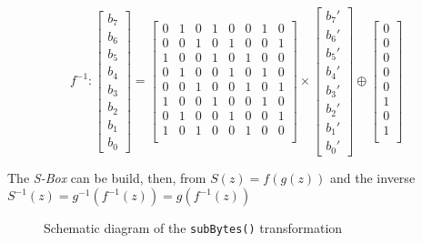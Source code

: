 \documentclass[10pt,a4paper,twoside]{llncs}
\begin{document}
\begin{equation}\label{eq:invSubBytes:matrix}
 f^{-1}:
 \left[
  \begin{array}{c}
    b_{7}\\b_{6}\\b_{5}\\b_{4}\\b_{3}\\b_{2}\\b_{1}\\b_{0}
  \end{array}
 \right]=\left[
  \begin{array}{cccccccc}
    0&1&0&1&0&0&1&0\\
    0&0&1&0&1&0&0&1\\
    1&0&0&1&0&1&0&0\\
    0&1&0&0&1&0&1&0\\
    0&0&1&0&0&1&0&1\\
    1&0&0&1&0&0&1&0\\
    0&1&0&0&1&0&0&1\\
    1&0&1&0&0&1&0&0\\
  \end{array}
 \right]\times\left[
  \begin{array}{c}
    b_{7}'\\b_{6}'\\b_{5}'\\b_{4}'\\b_{3}'\\b_{2}'\\b_{1}'\\b_{0}'
  \end{array}
 \right]\oplus\left[
  \begin{array}{c}
    0\\0\\0\\0\\0\\1\\0\\1\\
  \end{array}
 \right]
\end{equation}

The \emph{S-Box} can be build, then, from $S(z)=f(g(z))$ and the inverse $S^{-1}(z)=g^{-1}(f^{-1}(z))=g(f^{-1}(z))$

\begin{figure}[ht]
\begin{center}

\caption{Schematic diagram of the {\tt subBytes()} transformation}
\label{fig:subBytes}
\end{center}
\end{figure}
\end{document}
